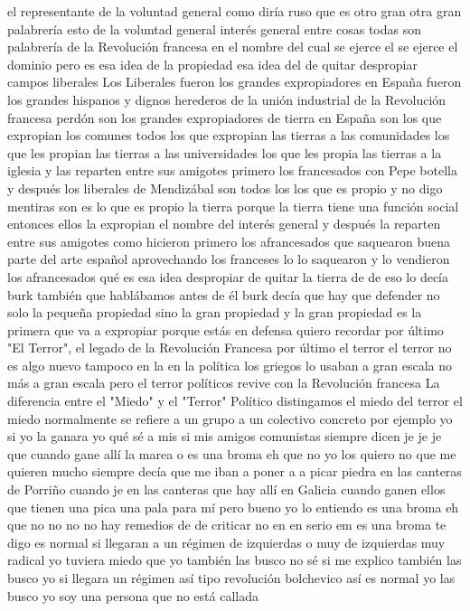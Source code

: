 el representante de la voluntad general como diría ruso que es otro gran otra gran palabrería esto de la voluntad general
interés general entre cosas todas son palabrería de la Revolución francesa en el nombre del cual se ejerce el
se ejerce el dominio pero es esa idea de la propiedad esa idea del de quitar despropiar campos liberales
Los Liberales fueron los grandes expropiadores en España
fueron los grandes hispanos y dignos herederos de la unión industrial de la Revolución francesa perdón son los grandes expropiadores de tierra
en España son los que expropian los comunes todos los que expropian las tierras a las comunidades los que les propian las tierras a las universidades
los que les propia las tierras a la iglesia y las reparten entre sus amigotes primero los francesados
con Pepe botella y después los liberales de Mendizábal son todos los los que es propio y no digo mentiras
son es lo que es propio la tierra porque la tierra tiene una función social entonces ellos la expropian el nombre del interés general
y después la reparten entre sus amigotes como hicieron primero los afrancesados que saquearon buena parte del arte español
aprovechando los franceses lo lo saquearon y lo vendieron los afrancesados
qué es esa idea despropiar de quitar la tierra de de eso lo decía burk
también que hablábamos antes de él burk decía que hay que defender no solo la pequeña propiedad sino la gran propiedad
y la gran propiedad es la primera que va a expropiar porque estás en defensa quiero recordar por último
"El Terror", el legado de la Revolución Francesa
por último el terror
el terror no es algo nuevo tampoco en la en la política los griegos lo usaban a gran escala
no más a gran escala pero el terror políticos revive con la Revolución francesa
La diferencia entre el "Miedo" y el "Terror" Político
distingamos el miedo del terror el miedo normalmente se refiere a un grupo a un colectivo concreto por ejemplo yo
si yo la ganara yo qué sé a mis si mis amigos comunistas siempre dicen je je je
que cuando gane allí la marea o es una broma eh que no yo los quiero no que me quieren mucho siempre decía que me iban a poner a a picar piedra
en las canteras de Porriño cuando je en las canteras que hay allí en Galicia cuando ganen ellos que tienen una pica
una pala para mí pero bueno yo lo entiendo es una broma eh que no no
no no hay remedios de de criticar no en en serio em es una broma te digo
es normal si llegaran a un régimen de izquierdas o muy de izquierdas muy radical yo tuviera miedo
que yo también las busco no sé si me explico también las busco yo
si llegara un régimen así tipo revolución bolchevico así es normal yo las busco yo soy una persona que no está callada
